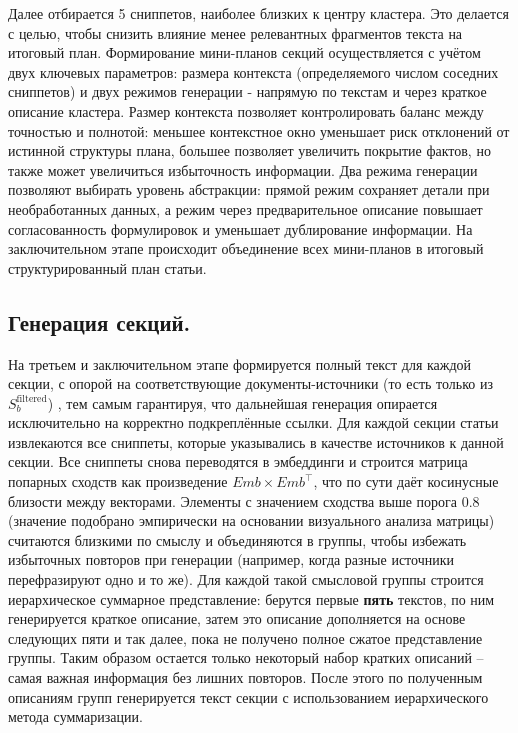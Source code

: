 \documentclass{article}
\theoremstyle{definition}
\theoremstyle{plain}
\begin{document}
Далее отбирается 5 сниппетов, наиболее близких к центру кластера. Это делается с целью, чтобы снизить влияние менее релевантных фрагментов текста на итоговый план. 
Формирование мини-планов секций осуществляется с учётом двух ключевых параметров: 
размера контекста (определяемого числом соседних сниппетов) и двух режимов генерации - напрямую по текстам и через краткое описание кластера.
Размер контекста позволяет контролировать баланс между точностью и полнотой: 
меньшее контекстное окно уменьшает риск отклонений от истинной структуры плана, большее позволяет увеличить покрытие фактов, но также может увеличиться избыточность информации.
Два режима генерации позволяют выбирать уровень абстракции: 
прямой режим сохраняет детали при необработанных данных, а режим через предварительное описание
повышает согласованность формулировок и уменьшает дублирование информации.
На заключительном этапе происходит объединение всех мини-планов в итоговый структурированный план статьи.

\subsection*{Генерация секций.}
На третьем и заключительном этапе формируется полный текст для каждой секции, с опорой на соответствующие документы-источники (то есть только из \(S_b^{\mathrm{filtered}}\))
, тем самым гарантируя, что дальнейшая генерация опирается исключительно на корректно подкреплённые ссылки. 
Для каждой секции статьи извлекаются все сниппеты, которые указывались в качестве источников к данной секции. 
Все сниппеты снова переводятся в эмбеддинги и строится матрица попарных сходств как произведение \(Emb \times Emb^\top\), что по сути даёт косинусные близости между векторами. 
Элементы с значением сходства выше порога 0.8 (значение подобрано эмпирически на основании визуального анализа матрицы) считаются близкими по смыслу и объединяются в группы, 
чтобы избежать избыточных повторов при генерации (например, когда разные источники перефразируют одно и то же). 
Для каждой такой смысловой группы строится иерархическое суммарное представление: 
берутся первые \textbf{пять} текстов, по ним генерируется краткое описание, затем это описание дополняется на основе следующих пяти и так далее, пока не получено полное сжатое представление группы.
Таким образом остается только некоторый набор кратких описаний – самая важная информация без лишних повторов.
После этого по полученным описаниям групп генерируется текст секции с использованием иерархического метода суммаризации.
\end{document}
